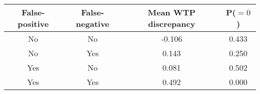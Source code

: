 \begin{table}[H]\centering \begin{tabular}{cccc} \hline \hline
\textbf{False-positive}&\textbf{False-negative}&\textbf{Mean WTP discrepancy}& \textbf{P($=0$)}\\ \hline
No&No&-0.106&0.433\\
No&Yes&0.143&0.250\\
Yes&No&0.081&0.502\\
Yes&Yes&0.492&0.000\\
\hline \end{tabular} \end{table}
